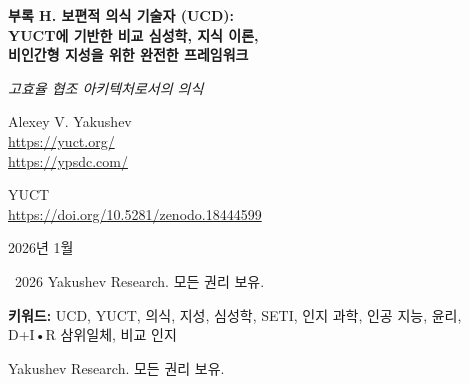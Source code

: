 \documentclass[11pt,a4paper]{article}
\DeclareRobustCommand{\alD}{\texorpdfstring{\ensuremath{\alpha_{\mathrm{D}}}}{alpha_D}}
\DeclareRobustCommand{\beI}{\texorpdfstring{\ensuremath{\beta_{\mathrm{I}}}}{beta_I}}
\DeclareRobustCommand{\gaR}{\texorpdfstring{\ensuremath{\gamma_{\mathrm{R}}}}{gamma_R}}
\newcommand{\eff}{\mathrm{eff}}
\newcommand{\Ke}{K_{\eff}}
\begin{document}
	
	\begin{titlepage}
		\begin{center}
			\vspace*{0cm}
			
			\Huge\textbf{부록 H. 보편적 의식 기술자 (UCD):\\ YUCT에 기반한 비교 심성학, 지식 이론,\\ 비인간형 지성을 위한 완전한 프레임워크}
			
			\vspace{1cm}
			
			\small\textit{고효율 협조 아키텍처로서의 의식}
			
			\vspace{1cm}
			\Large
			Alexey V. Yakushev\\
			
			\url{https://yuct.org/}\\
			\url{https://ypsdc.com/}
			
			\vspace{2cm}
			\large YUCT \\ 
			\url{https://doi.org/10.5281/zenodo.18444599}\\
			\vspace{1cm}
			
			\vspace{0cm}
			\large
			2026년 1월
			
			\vspace{6cm}
			\textcopyright~2026 Yakushev Research. 모든 권리 보유.
			
			\newpage
			
			\begin{abstract}
				\noindent
				본 논문은 보편적 의식 기술자(UCD)와 야쿠셰프 통합 협조 이론(YUCT)을 통합한 완전한 통합 의식-지식 프레임워크를 제시한다. 의식/지성/정신이 고효율(\(\Ke \gg 1\)) 협조 아키텍처라는 근본적 통찰에 기초하여, 우리는 다음을 전개한다: (1) 임의의 인지 에이전트의 기본적 분해로서의 D+I\(\cdot\)R 삼위일체의 완전한 수학적 정식화, (2) 종과 기질을 초월한 정량적 비교를 위한 세 가지 스펙트럼 매개변수(\alD, \beI, \gaR), (3) 협조 정보 처리로서의 지식 이론, (4) 생물학적, 인공적, 지구 외 시스템에서 의식을 측정하기 위한 상세한 실험 프로토콜, (5) 천체물리학 SETI 2.0 탐색을 위한 구체적 예측, (6) 기존 의식 이론(IIT, 전역 작업 공간, 예측 처리)과의 비교, (7) 의학, AI 안전, 사이버 보안에서의 윤리적 함의와 실천적 응용, (8) 인지 계층 정리, 협조 효율의 상한, 계산 복잡성 경계를 포함하는 완전한 수학적 증명. 이 프레임워크는 오랜 철학적 문제들을 해결함과 동시에 15개 이상의 실험 영역에서 검증 가능한 예측을 제공한다.
			\end{abstract}
			
			\vspace{0cm}
			
			\noindent
			\small\textbf{키워드:} UCD, YUCT, 의식, 지성, 심성학, SETI, 인지 과학, 인공 지능, 윤리, D+I•R 삼위일체, 비교 인지
			
			\vspace{0.5cm}
			
			\noindent
			 Yakushev Research. 모든 권리 보유.
		\end{center}
	\end{titlepage}
	
\end{document}
